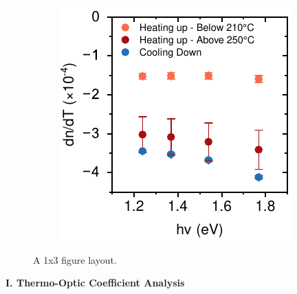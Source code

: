 \begin{figure}[htbp]
\begin{subfigure}{0.32\textwidth}
        \caption{}
        \label{fig:ellipsometry:thermooptic_cooling}
    \end{subfigure}
    \hfill
    \begin{subfigure}{0.3\textwidth}
        \includegraphics[width=\textwidth]{chapters/ellipsometry/image/Thermo-optic_Coefficient_energy.pdf}
        \caption{}
        \label{fig:ellipsometry:thermooptic_energy}
    \end{subfigure}
    \caption{A 1x3 figure layout.}
    \label{fig:ellipsometry:thermooptic}
\end{figure}


\textbf{I. Thermo-Optic Coefficient Analysis}

